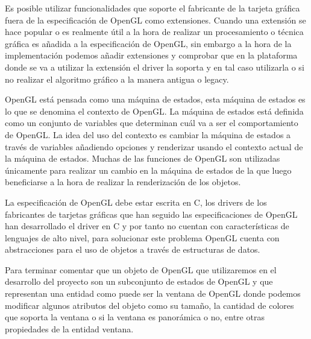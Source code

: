 \documentclass[a4paper, 17pt]{book}
\begin{document}
\vspace{1mm} %

Es posible utilizar funcionalidades que soporte el fabricante de la tarjeta gráfica fuera de la especificación de OpenGL
como extensiones. Cuando una extensión se hace popular o es realmente útil a la hora de realizar un procesamiento o
técnica gráfica es añadida a la especificación de OpenGL, sin embargo a la hora de la implementación podemos añadir
extensiones y comprobar que en la plataforma donde se va a utilizar la extensión el driver la soporta y en tal caso
utilizarla o si no realizar el algoritmo gráfico a la manera antigua o legacy.

\vspace{1mm} %

OpenGL está pensada como una máquina de estados, esta máquina de estados es lo que se denomina el contexto de OpenGL.
La máquina de estados está definida como un conjunto de variables que determinan cuál va a ser el comportamiento de OpenGL.
La idea del uso del contexto es cambiar la máquina de estados a través de variables añadiendo opciones y renderizar usando
el contexto actual de la máquina de estados. Muchas de las funciones de OpenGL son utilizadas únicamente para realizar un
cambio en la máquina de estados de la que luego beneficiarse a la hora de realizar la renderización de los objetos.

\vspace{1mm} %

La especificación de OpenGL debe estar escrita en C, los drivers de los fabricantes de tarjetas gráficas que han seguido
las especificaciones de OpenGL han desarrollado el driver en C y por tanto no cuentan con características de lenguajes
de alto nivel, para solucionar este problema OpenGL cuenta con abstracciones para el uso de objetos a través de estructuras de datos.

\vspace{1mm} %

Para terminar comentar que un objeto de OpenGL que utilizaremos en el desarrollo del proyecto son un subconjunto de estados
de OpenGL y que representan una entidad como puede ser la ventana de OpenGL donde podemos modificar algunos atributos del
objeto como su tamaño, la cantidad de colores que soporta la ventana o si la ventana es panorámica o no, entre otras
propiedades de la entidad ventana.

\vspace{1mm} %
\end{document}
